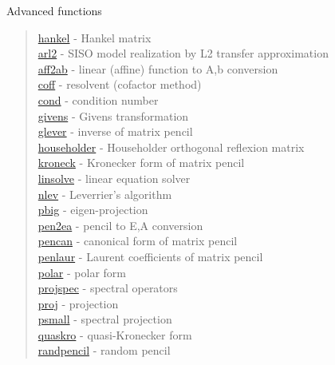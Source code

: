 
 







 
 
 
 
 
 


Advanced functions

\begin{quote}
\noindent
\hyperlink{hankel}{hankel} - Hankel matrix \\
\hyperlink{arl2}{arl2} - SISO model realization by L2 transfer approximation \\ 
\hyperlink{aff2ab}{aff2ab} - {linear (affine) function to A,b conversion} \\  
\hyperlink{coff}{coff} - {resolvent (cofactor method)  } \\  
\hyperlink{cond}{cond} - {condition number} \\  
\hyperlink{givens}{givens} - {Givens transformation} \\  
\hyperlink{glever}{glever} - {inverse of matrix pencil} \\  
\hyperlink{householder}{householder} - {Householder orthogonal reflexion matrix} \\  
\hyperlink{kroneck}{kroneck} - {Kronecker form of matrix pencil} \\  
\hyperlink{linsolve}{linsolve} - {linear equation solver} \\  
\hyperlink{nlev}{nlev} - {Leverrier's algorithm} \\  
\hyperlink{pbig}{pbig} - {eigen-projection} \\  
\hyperlink{pen2ea}{pen2ea} - {pencil to E,A conversion} \\  
\hyperlink{pencan}{pencan} - {canonical form of matrix pencil} \\  
\hyperlink{penlaur}{penlaur} - {Laurent coefficients of matrix pencil} \\  
\hyperlink{polar}{polar} - {polar form} \\  
\hyperlink{projspec}{projspec} - {spectral operators} \\  
\hyperlink{proj}{proj} - {projection} \\  
\hyperlink{psmall}{psmall} - {spectral projection} \\  
\hyperlink{quaskro}{quaskro} - {quasi-Kronecker form} \\  
\hyperlink{randpencil}{randpencil} - {random pencil} \\  

\end{quote}
